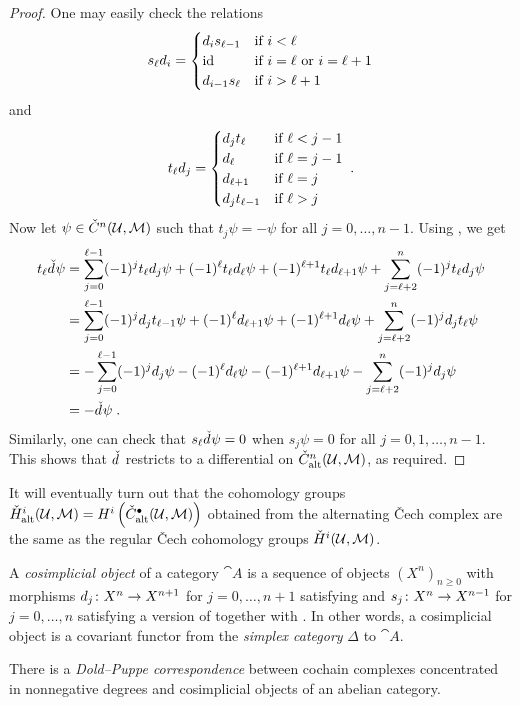 \documentclass[a4paper,parskip=half,numbers=enddot, DIV=12]{scrreprt}
\newcommand{\vC}{\v{C}}
\renewcommand{\geq}{\geqslant}
\begin{document}
\begin{proof}
		One may easily check the relations
		\begin{align}\lbl{eq:cosimplicialDegeneracies}
			s_\ell d_i=\begin{cases}
				d_is_{\ell-1} & \text{if }i<\ell\\
				\id &  \text{if }i=\ell\text{ or }i=\ell+1\\
				d_{i-1}s_\ell &  \text{if }i>\ell+1
			\end{cases}
		\end{align}
		and
		\begin{align}\lbl{eq:transpositions}
			t_\ell d_j=\begin{cases}
				d_jt_{\ell} & \text{if }\ell<j-1\\
				d_\ell &  \text{if }\ell=j-1\\
				d_{\ell+1} &  \text{if }\ell=j\\
				d_jt_{\ell-1} & \text{if }\ell>j
			\end{cases}\;.
		\end{align}
		Now let $\psi\in\check{C}^n(\mathcal{U},\mathcal{M})$ such that $t_j\psi=-\psi$ for all $j=0,\ldots,n-1$. Using , we get
		\begin{align*}
			t_\ell\check{d}\hspace{0.06125em}\psi&=\sum_{j=0}^{\ell-1}(-1)^jt_\ell d_j\psi+(-1)^\ell t_\ell d_\ell\psi+(-1)^{\ell+1} t_\ell d_{\ell+1}\psi+\sum_{j=\ell+2}^n(-1)^jt_\ell d_j\psi\\
			&=\sum_{j=0}^{\ell-1}(-1)^jd_jt_{\ell-1}\psi+(-1)^\ell d_{\ell+1}\psi+(-1)^{\ell+1} d_\ell\psi+\sum_{j=\ell+2}^{n}(-1)^j d_jt_\ell\psi\\
			&=-\sum_{j=0}^{\ell-1}(-1)^jd_j\psi-(-1)^\ell d_\ell\psi-(-1)^{\ell+1} d_{\ell+1}\psi-\sum_{j=\ell+2}^{n}(-1)^j d_j\psi\\
			&=-\check{d}\hspace{0.06125em}\psi\;.
		\end{align*}
		Similarly, one can check that $s_\ell\check{d}\hspace{0.06125em}\psi=0$ when $s_j\psi=0$ for all $j=0,1,\ldots,n-1$. This shows that $\check{d}\hspace{0.06125em}$ restricts to a differential on $\check{C}_{\mathrm{alt}}
		^n(\mathcal{U},\mathcal{M})$, as required.
	\end{proof}
	It will eventually turn out that the cohomology groups $\check{H}_{\mathrm{alt}}^i(\mathcal{U},\mathcal{M})=H^i\left(\check{C}_{\mathrm{alt}}^\bullet (\mathcal{U},\mathcal{M})\right)$ obtained from the alternating \vC ech complex are the same as the regular \vC ech cohomology groups $\check{H}^i(\mathcal{U},\mathcal{M})$.
\begin{rem}
	A \emph{cosimplicial object} of a category ${\cat A}$ is a sequence of objects $(X^n)_{n\geq 0}$ with morphisms $d_j\colon X^n\morphism X^{n+1}$ for $j=0,\ldots,n+1$ satisfying  and $s_j\colon X^n\morphism X^{n-1}$ for $j=0,\ldots,n$ satisfying a version of  together with . In other words, a cosimplicial object is a covariant functor from the \emph{simplex category} $\Delta$ to ${\cat A}$.
	
	There is a \emph{Dold--Puppe correspondence} between cochain complexes concentrated in nonnegative degrees and cosimplicial objects of an abelian category.  
\end{rem}
\end{document}
